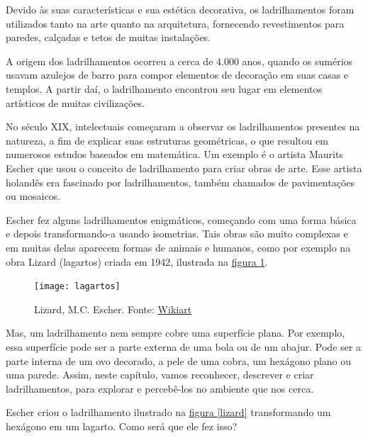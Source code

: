 \mainmatter


\label{ladri-exp-1}

Devido às suas características e sua estética decorativa, os ladrilhamentos foram utilizados tanto na arte quanto na arquitetura, fornecendo revestimentos para paredes, calçadas e tetos de muitas instalações. 

A origem dos ladrilhamentos ocorreu a cerca de  4.000 anos, quando os sumérios usavam azulejos de barro para compor elementos de decoração em suas casas e templos. A partir daí, o ladrilhamento encontrou seu lugar em elementos artísticos de muitas civilizações. 

No século XIX, intelectuais começaram a observar os ladrilhamentos presentes na natureza, a fim de explicar suas estruturas geométricas, o que resultou em numerosos estudos baseados em matemática. Um exemplo é  o artista Maurits Escher que usou o conceito de ladrilhamento para criar obras de arte. Esse artista holandês era fascinado por ladrilhamentos, também chamados de pavimentações ou mosaicos. 

Escher fez alguns ladrilhamentos enigmáticos, começando com uma forma básica e depois transformando-a usando isometrias.  Tais obras são muito complexas e em muitas delas aparecem formas de  animais e humanos, como por exemplo na obra  Lizard (lagartos) criada em 1942, ilustrada na \hyperref[lad-fig-1]{figura \ref{lad-fig-1}}.

\begin{figure}[H]
\centering
\texttt{[image: lagartos]}

\caption{Lizard, M.C. Escher. Fonte: \href{https://www.wikiart.org/en/m-c-escher/lizard-1}{Wikiart}}
\label{lad-fig-1}
\end{figure}


Mas, um ladrilhamento nem sempre cobre uma superfície plana. Por exemplo, essa  superfície pode ser a parte externa de uma bola ou de um abajur. Pode ser  a parte interna de um ovo decorado, a pele de uma cobra, um hexágono plano ou uma parede. Assim, neste capítulo, vamos reconhecer, descrever e criar ladrilhamentos, para explorar e percebê-los no ambiente que nos cerca.

\begin{reflection}
Escher criou o ladrilhamento ilustrado na \hyperref[lizard]{figura \ref{lizard}}  transformando um hexágono em um lagarto. Como será que ele fez isso?
\end{reflection}



